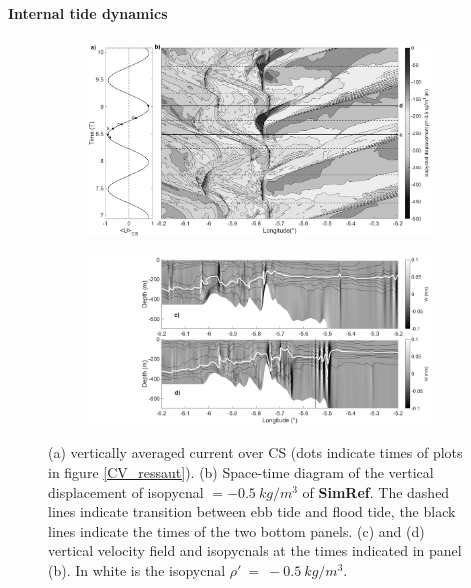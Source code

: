 \paragraph{Internal tide dynamics}
\begin{figure}[!t]
\centering
\begin{subfigure}{1\linewidth}
\centering
\includegraphics[width=1\linewidth]{./papier2D/hov_ref_-05.png}
\end{subfigure}

\begin{subfigure}{1\linewidth}
   \centering
  \includegraphics[width=\textwidth]{./papier2D/RW_J4_9h12-15h48.png}
\end{subfigure}
 \caption {(a) vertically averaged current over CS (dots indicate times of plots in figure \ref{CV_ressaut}). (b) Space-time diagram of the vertical displacement of isopycnal $=-0.5 \ kg/m^3$ of \textbf{SimRef}. The dashed lines indicate transition between ebb tide and flood tide, the black lines indicate the times of the two bottom panels. (c) and (d) vertical velocity field and isopycnals at the times indicated in panel (b). In white is the isopycnal $\rho'\ =\ -0.5 \ kg/m^3 $.}
 \label{hov_ref}
\end{figure}

